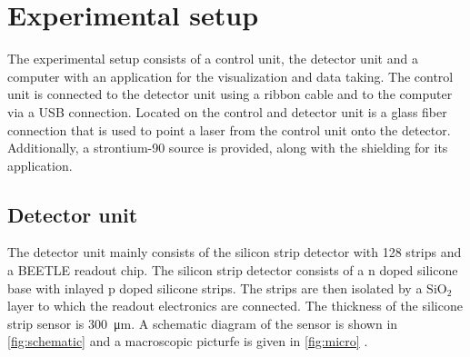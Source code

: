 \section{Experimental setup}
The experimental setup consists of a control unit, the detector unit and a computer with an application for the visualization and data taking. The control unit is connected to the detector unit using a ribbon cable and to the computer via a USB connection. Located on the control and detector unit is a glass fiber connection that is used to point a laser from the control unit onto the detector. Additionally, a strontium-90 source is provided, along with the shielding for its application.

\subsection{Detector unit}
The detector unit mainly consists of the silicon strip detector with 128 strips and a BEETLE readout chip. The silicon strip detector consists of a n doped silicone base with inlayed p doped silicone strips. The strips are then isolated by a $\mathrm{SiO}_2$ layer to which the readout electronics are connected. The thickness of the silicone strip sensor is \qty{300}{\micro\meter}. A schematic diagram of the sensor is shown in \autoref{fig:schematic} and a macroscopic picturfe is given in \autoref{fig:micro} \cite{V15}. 



